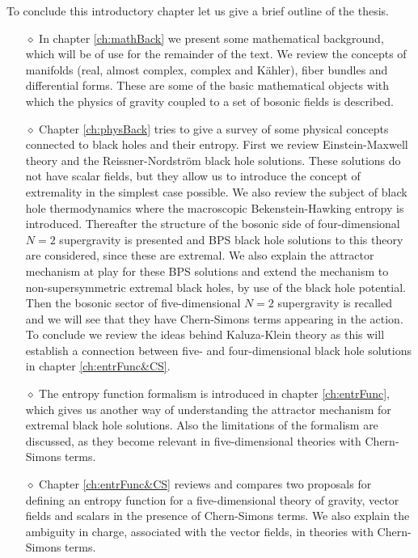 \documentclass[12pt,twoside]{book}
\begin{document}
\noindent
To conclude this introductory chapter let us give a brief outline of the thesis.
\begin{itemize}
\item[$\diamond$]
In chapter \ref{ch:mathBack} we present some mathematical background, which will be of use for the remainder of the text. We review the concepts of manifolds (real, almost complex, complex and K\"ahler), fiber bundles and differential forms. These are some of the basic mathematical objects with which the physics of gravity coupled to a set of bosonic fields is described.

\item[$\diamond$]
Chapter \ref{ch:physBack} tries to give a survey of some physical concepts connected to black holes and their entropy. First we review Einstein-Maxwell theory and the Reissner-Nordstr\"om black hole solutions. These solutions do not have scalar fields, but they allow us to introduce the concept of extremality in the simplest case possible.
We also review the subject of black hole thermodynamics where the macroscopic Bekenstein-Hawking entropy is introduced. Thereafter the structure of the bosonic side of four-dimensional $N=2$ supergravity is presented and BPS black hole solutions to this theory are considered, since these are extremal. We also explain the attractor mechanism at play for these BPS solutions and extend the mechanism to non-supersymmetric extremal black holes, by use of the black hole potential. Then the bosonic sector of five-dimensional $N=2$ supergravity is recalled and we will see that they have Chern-Simons terms appearing in the action. To conclude we review the ideas behind Kaluza-Klein theory as this will establish a connection between five- and four-dimensional black hole solutions in chapter \ref{ch:entrFunc&CS}.

\item[$\diamond$]
The entropy function formalism is introduced in chapter \ref{ch:entrFunc}, which gives us another way of understanding the attractor mechanism for extremal black hole solutions. Also the limitations of the formalism are discussed, as they become relevant in five-dimensional theories with Chern-Simons terms.

\item[$\diamond$]
Chapter \ref{ch:entrFunc&CS} reviews and compares two proposals for defining an entropy function for a five-dimensional theory of gravity, vector fields and scalars in the presence of Chern-Simons terms. We also explain the ambiguity in charge, associated with the vector fields, in theories with Chern-Simons terms.
\end{itemize}
\end{document}
